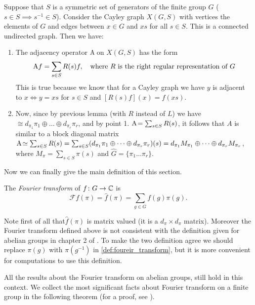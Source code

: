 \begin{rem}
Suppose  that $S$  is  a  symmetric  set  of  generators  of  the finite group $G$ ($s\in S \implies s^{-1}\in S$). Consider the Cayley graph $X(G,S)$   with vertices the elements  of $G$  and edges between $x \in G$   and $xs$  for  all $s\in S$.  This is a connected undirected  graph. Then we have:
\begin{enumerate}
\item The adjacency operator $\operatorname{A\!}$ on $X(G,S)$ has the form
\[
\operatorname{A\!} f = \sum_{s\in S}R(s)f, \quad \text{where $R$ is the right regular representation of $G$} \]
This is true because we know that for a Cayley graph we have $y$ is adjacent to $x \iff y=xs$ for $s\in S$ and $[R(s)f](x)=f(xs)$.
\item Now, since by previous lemma (with $R$ instead of $L$) we have $\cong d_{\pi_1}\pi_1\oplus\dots\oplus d_{\pi_r}\pi_r$, and by point 1. $\operatorname{A\!}=\sum_{s\in S}R(s)$, it follows that $A$ is similar to a block diagonal matrix $\operatorname{A\!}\simeq \sum_{s\in S}R(s)=\sum_{s\in S}(d_{\pi_1}\pi_1\oplus\dots\oplus d_{\pi_r}\pi_r)(s)= d_{\pi_1}M_{\pi_1}\oplus\dots\oplus d_{\pi_r}M_{\pi_r}$, where $M_\pi=\sum_{s\in S}\pi(s)$ and $\hat{G}=\{\pi_1\dots\pi_r\}$.
\end{enumerate}
\end{rem}
Now we can finally give the main definition of this section.
\begin{defn}
The \emph{Fourier transform} of $f\colon G\rightarrow {\mathbb C}$ is
\begin{equation}
\label{def:foureir_transform}
\mathscr{F}f(\pi)=\hat{f}(\pi)=\sum_{g\in G} f(g)\pi(g).
\end{equation}
\end{defn}
\begin{rem}
Note first of all that$\hat{f}(\pi)$ is matrix valued (it is a $d_\pi\times d_\pi$ matrix). Moreover the Fourier transform  defined  above is not consistent with the definition given for abelian groups in chapter 2 of \cite{terras_1999}. To make the two definition agree we should replace $\pi(g)$ with $\pi(g^{-1})$ in \eqref{def:foureir_transform}, but it is more convenient for computations to use this  definition.
\end{rem}
All the results about the Fourier transform on abelian groups, still hold in this context. We collect the most significant facts about Fourier transform on a finite group in the following theorem (for a proof, see \cite{terras_1999}).
